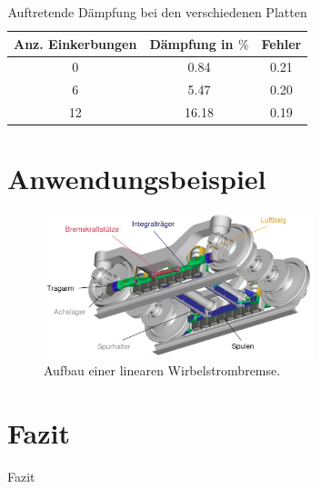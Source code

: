 \begin{frame}

  \begin{table}
    \caption{Auftretende Dämpfung bei den verschiedenen Platten}
     \begin{tabular}{c c c}
        \toprule
        Anz. Einkerbungen & Dämpfung in $\%$ & Fehler \\
        \midrule
        0 & 0.84 & 0.21 \\
        6 & 5.47 & 0.20 \\
        12 & 16.18 & 0.19 \\
        \bottomrule
      \end{tabular}
  \end{table}

\end{frame}

\section{Anwendungsbeispiel}

\begin{frame}
  \begin{figure}
    \centering
    \includegraphics[width=0.7\textwidth]{Wirbelstrombremse_Aufbau.jpg}
    \caption{Aufbau einer linearen Wirbelstrombremse. \cite{Wirbelstrombremse}}
    \label{fig:linWAufbau}
  \end{figure}
\end{frame}

\section{Fazit}

\begin{frame}
  \centering
  \Huge Fazit
\end{frame}


\begin{frame}
  \printbibliography
\end{frame}



